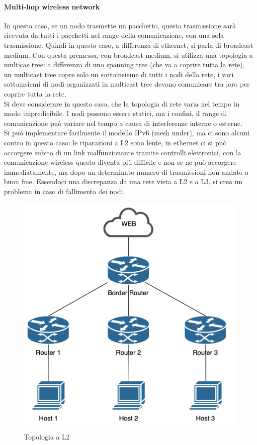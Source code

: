 \documentclass{article}
\begin{document}
\paragraph{Multi-hop wireless network}
In questo caso, se un nodo trasmette un pacchetto, questa trasmissione sarà ricevuta da tutti i pacchetti nel range della comunicazione, con una sola trasmissione. Quindi in questo caso, a differenza di ethernet, si parla di broadcast medium. Con questa premessa, con broadcast medium, si utilizza una topologia a multicas tree: a differenza di uno spanning tree (che va a coprire tutta la rete), un multicast tree copre solo un sottoinsieme di tutti i nodi della rete, i vari sottoinsiemi di nodi organizzati in multicast tree devono comunicare tra loro per coprire tutta la rete. \\ Si deve considerare in questo caso, che la topologia di rete varia nel tempo in modo impredicibile. I nodi possono essere statici, ma i confini, il range di comunicazione può variare nel tempo a causa di interferenze interne o esterne. \\ Si può implementare facilmente il modello IPv6 (mesh under), ma ci sono alcuni contro in questo caso: le riparazioni a L2 sono lente, in ethernet ci si può accorgere subito di un link malfunzionante tramite controlli elettronici, con la comunicazione wireless questo diventa più difficile e non se ne può accorgere immediatamente, ma dopo un determinato numero di trasmissioni non andato a buon fine. Essendoci una discrepanza da una rete vista a L2 e a L3, si crea un problema in caso di fallimento dei nodi.
\begin{figure}[H]
\centering
\includegraphics[scale=0.3]{figures/topologia L2.png}
\caption{Topologia a L2}
\end{figure}
\end{document}
